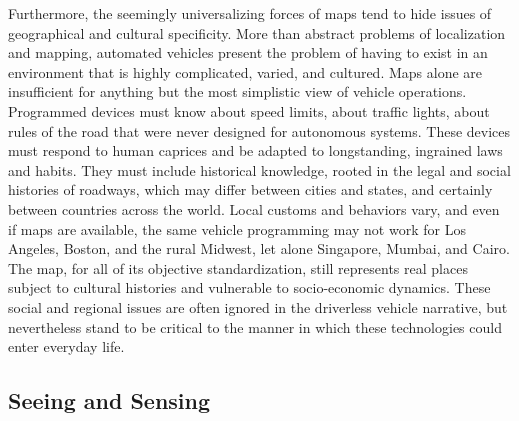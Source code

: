 Furthermore, the seemingly universalizing forces of maps tend to hide
issues of geographical and cultural 
specificity. More than
abstract problems of localization and mapping, automated vehicles
present the problem of having to exist in an environment that is
highly complicated, varied, and cultured. Maps alone are insufficient
for anything but the most simplistic view of vehicle operations.
Programmed devices
must know about speed limits, about traffic
lights, about rules of the road that were never designed for
autonomous systems. These devices must respond to human caprices and
be adapted to longstanding, ingrained laws and habits. They must
include historical knowledge, rooted in the legal and social histories
of roadways, which may differ between cities and states, and certainly
between countries across the world. Local customs and behaviors vary,
and even if maps are 
available, the same vehicle programming may not work for Los Angeles,
Boston, and the rural Midwest, let alone Singapore, Mumbai, and Cairo.
The map, for all of its objective standardization, still represents
real places subject to cultural histories and vulnerable to
socio-economic dynamics. These social and regional issues are often
ignored in the driverless vehicle narrative, but nevertheless stand to
be critical to the manner in which these technologies could
enter everyday life.



\subsection{Seeing and Sensing}





